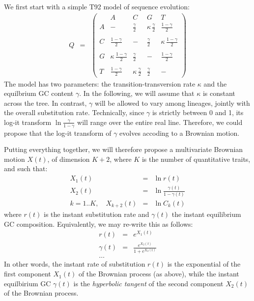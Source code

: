 \documentclass[usletter]{article}
\begin{document}
We first start with a simple T92 model of sequence evolution:
\begin{eqnarray*}
Q &=& 
\left( \begin{array}{r|rrrrr}
&A&C&G&T\\
\hline
A&- &  \frac{\gamma}{2}  & \kappa \, \frac{\gamma}{2} &  \frac{1 - \gamma}{2} \\
\\
C& \frac{1 - \gamma}{2} & - & \frac{\gamma}{2} & \kappa \, \frac{1 - \gamma}{2}  \\
\\
G&\kappa \, \frac{1 - \gamma}{2}  &  \frac{\gamma}{2}  & - & \frac{1 - \gamma}{2}  \\
\\
T& \frac{1 - \gamma}{2} & \kappa \, \frac{\gamma}{2}  &  \frac{\gamma}{2}  & -
\end{array} \right)
\end{eqnarray*}
The model has two parameters: the transition-transversion rate $\kappa$ and the equilbrium GC content $\gamma$. In the following, we will assume that $\kappa$ is constant across the tree. In contrast, $\gamma$ will be allowed to vary among lineages, jointly with the overall substitution rate.
Technically, since $\gamma$ is strictly between 0 and 1, its log-it transform $\ln \frac{\gamma}{1 - \gamma}$ will range over the entire real line. Therefore, we could propose that the log-it transform of $\gamma$ evolves accoding to a Brownian motion.

Putting everything together, we will therefore propose a multivariate Brownian motion $X(t)$, of dimension $K+2$, where $K$ is the number of quantitative traits, and such that:
\begin{eqnarray*}
X_1(t) &=& \ln r(t)
\\
X_2(t) &=& \ln \frac{\gamma(t)}{1 - \gamma(t)}
\\
k=1..K, \quad X_{k+2}(t) &=& \ln C_k(t)
\end{eqnarray*}
where $r(t)$ is the instant substitution rate and $\gamma(t)$ the instant equilibrium GC composition.
Equivalently, we may re-write this as follows:
\begin{eqnarray*}
r(t) &=& e^{X_1(t)}
\\
\gamma(t) &=& \frac{e^{X_2(t)}}{1 + e^{X_2(t)}}
\\
\ldots
\end{eqnarray*}
In other words, the instant rate of substitution $r(t)$ is the exponential of the first component $X_1(t)$ of the Brownian process (as above), while the instant equilbirium GC $\gamma(t)$ is the \emph{hyperbolic tangent} of the second component $X_2(t)$ of the Brownian process.
\end{document}
